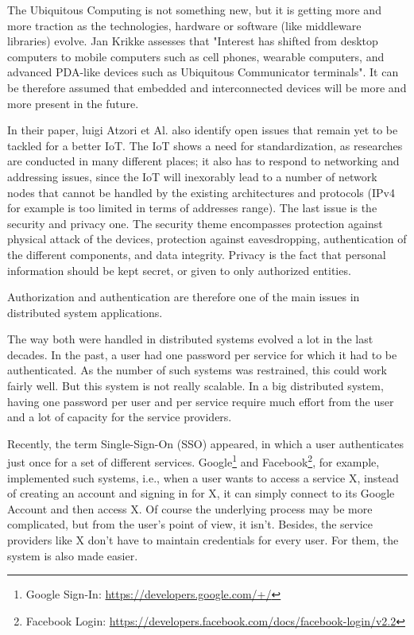 The Ubiquitous Computing is not something new, but it is getting more and more traction as the technologies, hardware or software (like middleware libraries) evolve. Jan Krikke assesses that "Interest has shifted from desktop computers to mobile computers such as cell phones, wearable computers, and advanced PDA-like devices such as Ubiquitous Communicator terminals"\cite{Krikke2005}. It can be therefore assumed that embedded and interconnected devices will be more and more present in the future.

In their paper, luigi Atzori et Al. also identify open issues that remain yet to be tackled for a better IoT. The IoT shows a need for standardization, as researches are conducted in many different places; it also has to respond to networking and addressing issues, since the IoT will inexorably lead to a number of network nodes that cannot be handled by the existing architectures and protocols (IPv4 for example is too limited in terms of addresses range). The last issue is the security and privacy one. The security theme encompasses protection against physical attack of the devices,  protection against eavesdropping, authentication of the different components, and data integrity. Privacy is the fact that personal information should be kept secret, or given to only authorized entities. 

Authorization and authentication are therefore one of the main issues in distributed system applications. 

The way both were handled in distributed systems evolved a lot in the last decades. In the past, a user had one password per service for which it had to be authenticated. As the number of such systems was restrained, this could work fairly well. But this system is not really scalable. In a big distributed system, having one password per user and per service require much effort from the user and a lot of capacity for the service providers. 

Recently, the term Single-Sign-On (SSO) appeared, in which a user authenticates just once for a set of different services. Google\footnote{Google Sign-In:  \url{https://developers.google.com/+/}} and Facebook\footnote{Facebook Login: \url{https://developers.facebook.com/docs/facebook-login/v2.2}}, for example, implemented such systems, i.e., when a user wants to access a service X, instead of creating an account and signing in for X, it can simply connect to its Google Account and then access X. Of course the underlying process may be more complicated, but from the user's point of view, it isn't. Besides, the service providers like X don't have to maintain credentials for every user. For them, the system is also made easier.

